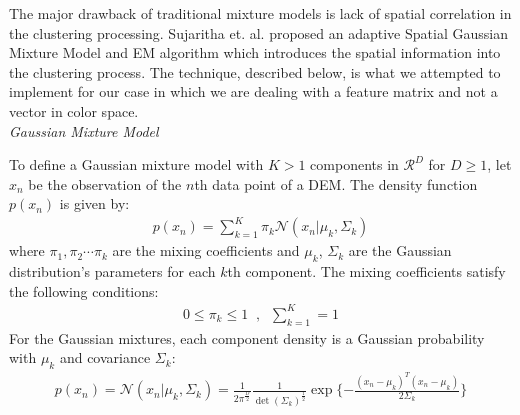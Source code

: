 \documentclass[12pt,letterpaper]{article}
\begin{document}
The major drawback of traditional mixture models is lack of spatial correlation in the clustering processing.
Sujaritha et. al. proposed an adaptive Spatial Gaussian Mixture Model and EM algorithm which introduces the spatial information into the clustering process. The technique, described below, is what we attempted to implement for our case in which we are dealing with a feature matrix and not a vector in color space. \\


\textit{Gaussian Mixture Model}

To define a Gaussian mixture model with $K > 1$ components in $\mathcal{R}^D$ for $D\ge1$, let $x_n$ be the observation of the $n$th data point of a DEM. The density function $p(x_n)$ is given by:
\begin{align}
 p(x_n) = \sum_{k=1}^{K}\pi_k\mathcal{N}(x_n | \mu_k, \Sigma_k)
\end{align}
where $\pi_1, \pi_2 \cdots \pi_k$ are the mixing coefficients and $\mu_k$, $\Sigma_k$ are the Gaussian distribution's parameters
for each $k$th component.
The mixing coefficients satisfy the following conditions:
\begin{align}
0\le\pi_k\le1 \;  \; , \; \;\sum_{k=1}^{K}=1
\end{align}
For the Gaussian mixtures, each component density is a Gaussian probability with $\mu_k$ and
covariance $\Sigma_k$:
\begin{align}
p(x_n) = \mathcal{N}(x_n | \mu_k, \Sigma_k) = \frac{1}{2\pi^{\frac{D}{2}}}\frac{1}{\det(\Sigma_k)^{\frac{1}{2}}} \exp\lbrace-\frac{(x_n - \mu_k)^T(x_n - \mu_k)}{2\Sigma_k}\rbrace
\end{align}
\end{document}
